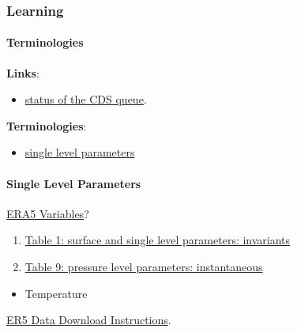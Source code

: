 \documentclass[
]{book}
\providecommand{\tightlist}{%
  \setlength{\itemsep}{0pt}\setlength{\parskip}{0pt}}
\begin{document}
\hypertarget{learning}{%
\subsubsection{Learning}\label{learning}}

\hypertarget{terminologies}{%
\paragraph{Terminologies}\label{terminologies}}

\textbf{Links}:

\begin{itemize}
\tightlist
\item
  \href{https://cds.climate.copernicus.eu/live/queue}{status of the CDS queue}.
\end{itemize}

\textbf{Terminologies}:

\begin{itemize}
\tightlist
\item
  \href{}{single level parameters}
\end{itemize}

\hypertarget{single-level-parameters}{%
\paragraph{Single Level Parameters}\label{single-level-parameters}}

\href{https://confluence.ecmwf.int/display/CKB/ERA5?src=breadcrumbs-parent}{ERA5 Variables}?

\begin{enumerate}
\def\labelenumi{\arabic{enumi}.}
\tightlist
\item
  \href{https://confluence.ecmwf.int/pages/viewpage.action?pageId=82870405\#ERA5:datadocumentation-Table1}{Table 1: surface and single level parameters: invariants}
\item
  \href{https://confluence.ecmwf.int/pages/viewpage.action?pageId=82870405\#ERA5:datadocumentation-Table9}{Table 9: pressure level parameters: instantaneous}
\end{enumerate}

\begin{itemize}
\tightlist
\item
  Temperature
\end{itemize}

\href{https://confluence.ecmwf.int/display/CKB/How+to+download+ERA5}{ER5 Data Download Instructions}.
\end{document}
